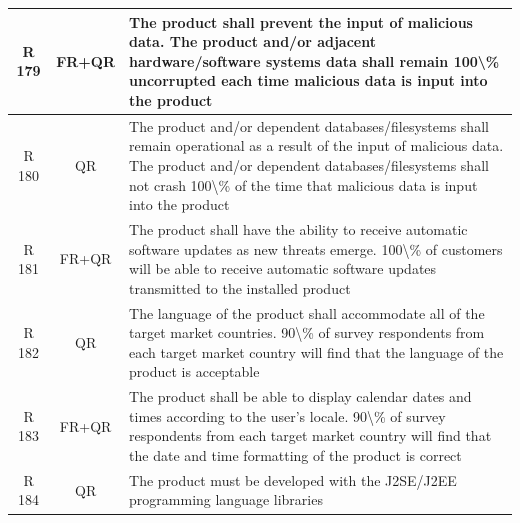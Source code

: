 \documentclass[dissertation,final]{softeng}
\begin{document}
\begin{appendices}
{\begin{center}
\begin{longtable}{c c m{}}
    R 179   & FR+QR & The product shall prevent the input of malicious data. The product and/or adjacent hardware/software systems data shall remain 100\textbackslash{}\% uncorrupted each time malicious data is input into the product \\    \midrule
    R 180   & QR & The product and/or dependent databases/filesystems shall remain operational as a result of the input of malicious data. The product and/or dependent databases/filesystems shall not crash 100\textbackslash{}\% of the time that malicious data is input into the product \\    \midrule
    R 181   & FR+QR & The product shall have the ability to receive automatic software updates as new threats emerge. 100\textbackslash{}\% of customers will be able to receive automatic software updates transmitted to the installed product \\    \midrule
    R 182   & QR & The language of the product shall accommodate all of the target market countries. 90\textbackslash{}\% of survey respondents from each target market country will find that the language of the product is acceptable \\    \midrule
    R 183   & FR+QR & The product shall be able to display calendar dates and times according to the user's locale. 90\textbackslash{}\% of survey respondents from each target market country will find that the date and time formatting of the product is correct \\    \midrule
    R 184   & QR & The product must be developed with the J2SE/J2EE programming language libraries \\
\end{longtable}
\end{center}
}


\end{appendices}
\end{document}
